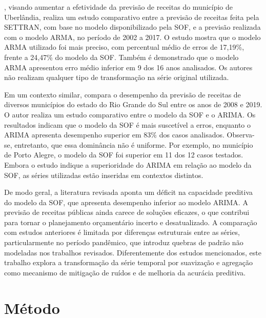 \documentclass[12pt]{tcc}
\begin{document}
\citet{da_silva_orcamento_2018}, visando aumentar a efetividade da previsão de receitas do município de Uberlândia, realiza um estudo comparativo entre a previsão de receitas feita pela \gls{SETTRAN}, com base no modelo disponibilizado pela \gls{SOF}, e a previsão realizada com o modelo \gls{ARMA}, no período de 2002 a 2017. O estudo mostra que o modelo \gls{ARMA} utilizado foi mais preciso, com percentual médio de erros de 17{,}19\%, frente a 24{,}47\% do modelo da \gls{SOF}. Também é demonstrado que o modelo \gls{ARMA} apresentou erro médio inferior em 9 dos 16 anos analisados. Os autores não realizam qualquer tipo de transformação na série original utilizada.

Em um contexto similar, \citet{naibert_orcamento_2021} compara o desempenho da previsão de receitas de diversos municípios do estado do Rio Grande do Sul entre os anos de 2008 e 2019. O autor realiza um estudo comparativo entre o modelo da \gls{SOF} e o \gls{ARIMA}. Os resultados indicam que o modelo da \gls{SOF} é mais suscetível a erros, enquanto o \gls{ARIMA} apresenta desempenho superior em 83\% dos casos analisados. Observa-se, entretanto, que essa dominância não é uniforme. Por exemplo, no município de Porto Alegre, o modelo da \gls{SOF} foi superior em 11 dos 12 casos testados. Embora o estudo indique a superioridade do \gls{ARIMA} em relação ao modelo da \gls{SOF}, as séries utilizadas estão inseridas em contextos distintos.

De modo geral, a literatura revisada aponta um déficit na capacidade preditiva do modelo da \gls{SOF}, que apresenta desempenho inferior ao modelo \gls{ARIMA}. A previsão de receitas públicas ainda carece de soluções eficazes, o que contribui para tornar o planejamento orçamentário incerto e desatualizado. A comparação com estudos anteriores é limitada por diferenças estruturais entre as séries, particularmente no período pandêmico, que introduz quebras de padrão não modeladas nos trabalhos revisados. Diferentemente dos estudos mencionados, este trabalho explora a transformação da série temporal por suavização e agregação como mecanismo de mitigação de ruídos e de melhoria da acurácia preditiva.

\chapter{Método}
\label{sec:metodologia} 
\end{document}
